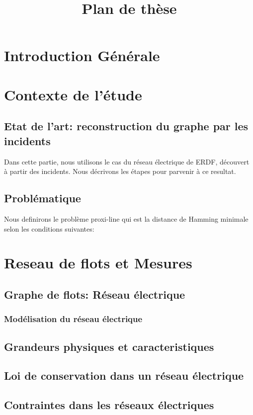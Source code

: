 \documentclass[onecolumn, 12pt]{book}
\title{Plan de th\`ese}
\date{\oldstylenums{1875}}
\begin{document}
\maketitle
\tableofcontents

\chapter{Introduction G\'en\'erale}
\chapter{Contexte de l'\'etude}
	\section{Etat de l'art: reconstruction du graphe par les incidents}
	Dans cette partie, nous utilisons le cas du r\'eseau \'electrique de ERDF, d\'ecouvert \`a partir des incidents. Nous d\'ecrivons les \'etapes pour parvenir \`a ce resultat. 
	
	\section{Probl\'ematique}
	Nous definirons le probl\`eme proxi-line qui est la distance de Hamming minimale selon les conditions suivantes:
	
\chapter{Reseau de flots et Mesures }
	
	\section{Graphe de flots: R\'eseau \'electrique}
		\subsection{Mod\'elisation du r\'eseau \'electrique}
	\section{Grandeurs physiques et caracteristiques}
	\section{Loi de conservation dans un r\'eseau \'electrique }
	\section{Contraintes dans les r\'eseaux \'electriques}
\end{document}
